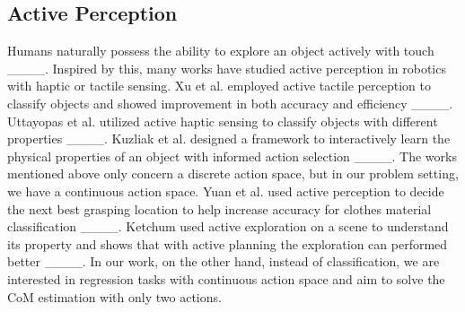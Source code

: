 \subsection{Active Perception}
Humans naturally possess the ability to explore an object actively with touch ____. Inspired by this, many works have studied active perception in robotics with haptic or tactile sensing. 
Xu et al. employed active tactile perception to classify objects and showed improvement in both accuracy and efficiency ____. Uttayopas et al. utilized active haptic sensing to classify objects with different properties ____. Kuzliak et al. designed a framework to interactively learn the physical properties of an object with informed action selection ____. The works mentioned above only concern a discrete action space, but in our problem setting, we have a continuous action space. Yuan et al. used active perception to decide the next best grasping location to help increase accuracy for clothes material classification ____. Ketchum used active exploration on a scene to understand its property and shows that with active planning the exploration can performed better ____. In our work, on the other hand, instead of classification, we are interested in regression tasks with continuous action space and aim to solve the CoM estimation with only two actions.